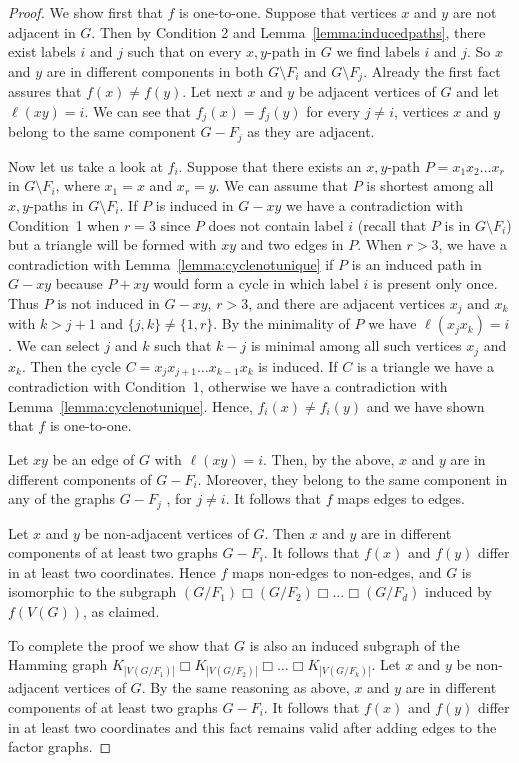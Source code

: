 \documentclass[12pt,a4paper,titlepage,openany]{report}
\begin{document}
\begin{proof}
We show first that $f$ is one-to-one. Suppose that vertices $x$ and $y$ are not adjacent in $G$. Then by Condition 2 and Lemma~\ref{lemma:inducedpaths}, there exist labels $i$ and $j$ such that on every $x, y$-path in $G$ we find labels $i$ and $j$. So $x$ and $y$ are in different components in both $G\setminus  F_i$ and $G\setminus  F_j$. Already the first fact assures that $f(x)\neq f(y)$. Let next $x$ and $y$ be adjacent vertices of $G$ and let $\ell(xy)=i$. We can see that $f_j(x)=f_j(y)$ for every $j\neq i$, vertices $x$ and $y$ belong to the same component $G-F_j$ as they are adjacent.

 Now let us take a look at $f_i$. Suppose that there exists an $x, y$-path $P=x_1x_2\ldots x_r$ in $G\setminus  F_i$, where $x_1=x$ and $x_r=y$. We can assume that $P$ is shortest among all $x, y$-paths in $G\setminus  F_i$. If $P$ is induced in $G-xy$ we have a contradiction with Condition~1 when $r=3$ since $P$ does not contain label $i$ (recall that $P$ is in $G\setminus  F_i$) but a triangle will be formed with $xy$ and two edges in $P$. When $r>3$, we have a contradiction with Lemma~\ref{lemma:cyclenotunique} if $P$ is an induced path in $G-xy$ because $P+xy$ would form a cycle in which label $i$  is present only once. Thus $P$ is not induced in $G-xy$, $r > 3$, and there are adjacent vertices $x_j$ and $x_k$ with $k > j+1$ and $\{j,k\}\neq \{1,r\}$. By the minimality of $P$ we have $\ell(x_jx_k)=i$. We can select $j$ and $k$ such that $k- j$ is minimal among all such vertices $x_j$ and $x_k$. Then the cycle $C=x_jx_{j+1}\ldots x_{k-1}x_k$ is induced. If $C$ is a triangle we have a contradiction with Condition~1, otherwise we have a
contradiction with Lemma~\ref{lemma:cyclenotunique}. Hence, $f_i(x)\neq f_i(y)$ and we have shown that $f$ is one-to-one.

Let $xy$ be an edge of $G$ with $\ell(xy)=i$. Then, by the above, $x$ and $y$ are in different components of $G-F_i$. Moreover, they belong to the same component in any of the graphs $G- F_j$ , for $j\neq i$. It follows that $f$ maps edges to edges.


Let $x$ and $y$ be non-adjacent vertices of $G$. Then $x$ and $y$ are in different components of at least two graphs $G-F_i$. It follows that $f(x)$ and $f(y)$ differ in at least two coordinates. Hence $f$ maps non-edges to non-edges, and $G$ is isomorphic to the subgraph $(G/F_1) \Box (G/ F_2) \Box \ldots \Box (G/F_d)$ induced by $f(V(G))$, as claimed.

To  complete the proof we show that $G$ is also an induced subgraph of the Hamming graph $K_{|V(G/ F_1)|} \Box K_{|V(G/ F_2)|} \Box \ldots \Box K_{|V(G/F_k)|}$. Let $x$ and $y$ be non-adjacent vertices of $G$.
By the same reasoning as above, $x$ and $y$ are in different components of at least two graphs $G-F_i$.
It follows that $f(x)$ and $f(y)$ differ in at least two coordinates and this fact remains valid after adding edges to the factor graphs.
\end{proof}
\end{document}
